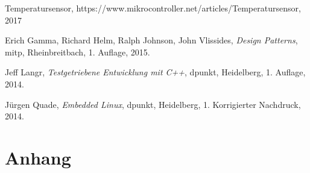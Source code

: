\begin{thebibliography}{9}

 Temperatursensor, https://www.mikrocontroller.net/articles/Temperatursensor, 2017

  Erich Gamma, Richard Helm, Ralph Johnson, John Vlissides,
  \emph{Design Patterns},
  mitp, Rheinbreitbach,
  1. Auflage,
  2015.

  Jeff Langr,
  \emph{Testgetriebene Entwicklung mit C++},
  dpunkt, Heidelberg,
  1. Auflage,
  2014.
  
  Jürgen Quade,
  \emph{Embedded Linux},
  dpunkt, Heidelberg,
  1. Korrigierter Nachdruck,
  2014.

\end{thebibliography}

\listoffigures
\listoftables

\clearpage

\section{Anhang}